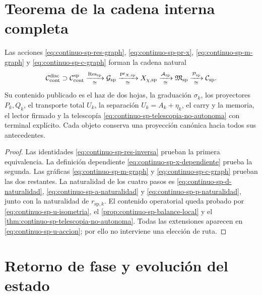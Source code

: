 \section{Teorema de la cadena interna completa}

\begin{theorem}
\label{thm:continuo-sp-cadena-interna}
Las acciones
\eqref{eq:continuo-sp-res-graph},
\eqref{eq:continuo-sp-pr-x},
\eqref{eq:continuo-sp-m-graph} y
\eqref{eq:continuo-sp-c-graph} forman la cadena natural
\begin{equation}
\label{eq:continuo-sp-cadena-interna}
 \mathcal C_{\rm cont}^{\rm disc}
 \supset\mathcal C_{\rm cont}^{\mathrm{sp}}
 \xrightarrow[\cong]{\operatorname{Res}_{\mathrm{sp}}}
 \mathcal G_{\mathrm{sp}}
 \xrightarrow[\cong]{\operatorname{pr}_{X,\mathrm{sp}}}
 X_{\chi,\mathrm{sp}}
 \xrightarrow[\cong]{\mathcal A_{\mathrm{sp}}}
 \mathfrak M_{\mathrm{sp}}
 \xrightarrow[\cong]{\mathcal P_{\mathrm{sp}}}
 \mathcal C_{\mathrm{sp}}.
\end{equation}
Su contenido publicado es el haz de dos hojas, la graduación
\(\sigma_k\), los proyectores \(P_k,Q_k\), el transporte total \(U_k\),
la separación \(U_k=A_k+\eta_k\), el carry y la memoria, el lector firmado
y la telescopía
\eqref{eq:continuo-sp-telescopia-no-autonoma} con terminal explícito. Cada
objeto conserva una proyección canónica hacia todos sus antecedentes.
\end{theorem}

\begin{proof}
Las identidades
\eqref{eq:continuo-sp-res-inversa} prueban la primera equivalencia. La
definición dependiente \eqref{eq:continuo-sp-x-dependiente} prueba la
segunda. Las gráficas
\eqref{eq:continuo-sp-m-graph} y
\eqref{eq:continuo-sp-c-graph} prueban las dos restantes. La naturalidad de
los cuatro pasos es
\eqref{eq:continuo-sp-d-naturalidad},
\eqref{eq:continuo-sp-a-naturalidad} y
\eqref{eq:continuo-sp-p-naturalidad}, junto con la naturalidad de
\(r_{\mathrm{sp},k}\). El contenido operatorial queda probado por
\eqref{eq:continuo-sp-u-isometria}, el
\cref{prop:continuo-sp-balance-local} y el
\cref{thm:continuo-sp-telescopia-no-autonoma}. Todas las extensiones aparecen
en \eqref{eq:continuo-sp-u-accion}; por ello no interviene una elección de
ruta.
\end{proof}

\section{Retorno de fase y evolución del estado}

